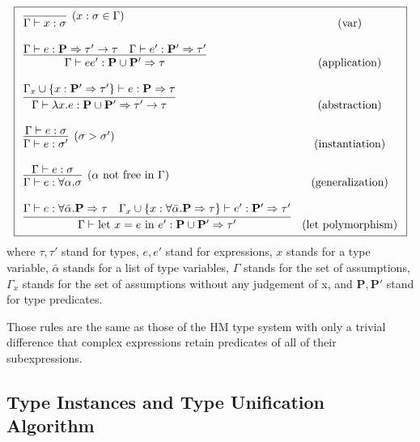 \begin{defn}
    $$\boxed{\begin{array}{l c}
        \infer[(x : \sigma \in \Gamma)]{\Gamma \vdash x : \sigma}{} & (\text{var}) \\\\
        \infer{\Gamma \vdash e e' : \mathbf{P} \cup \mathbf{P'}  \Rightarrow \tau}{\Gamma \vdash e : \mathbf{P} \Rightarrow \tau' \rightarrow \tau & \Gamma \vdash e' : \mathbf{P'} \Rightarrow \tau'} & (\text{application}) \\\\
        \infer{\Gamma \vdash \lambda x . e : \mathbf{P} \cup \mathbf{P'} \Rightarrow \tau' \rightarrow \tau}{\Gamma_x \cup \{x : \mathbf{P'} \Rightarrow \tau'\} \vdash e : \mathbf{P} \Rightarrow \tau} & (\text{abstraction}) \\\\
        \infer[(\sigma > \sigma')]{\Gamma \vdash e : \sigma'}{\Gamma \vdash e : \sigma} & (\text{instantiation}) \\\\
        \infer[(\alpha \text{ not free in }\Gamma)]{\Gamma \vdash e : \forall \alpha . \sigma}{\Gamma \vdash e : \sigma} & (\text{generalization}) \\\\
        \infer{\Gamma \vdash \text{let } x = e \text{ in } e' : \mathbf{P} \cup \mathbf{P'} \Rightarrow \tau'}{\Gamma \vdash e : \forall \bar{\alpha} .  \mathbf{P} \Rightarrow \tau & \Gamma_x \cup \{x :\forall \bar{\alpha} .  \mathbf{P} \Rightarrow \tau \} \vdash e' : \mathbf{P'} \Rightarrow \tau'} & (\text{let polymorphism})
    \end{array}}$$
    where $\tau, \tau'$ stand for types, $e, e'$ stand for expressions, $x$ stands for a type variable, $\bar{\alpha}$ stands for a list of type variables, $\Gamma$ stands for the set of assumptions, $\Gamma_x$ stands for the set of assumptions without any judgement of x, and $\mathbf{P}, \mathbf{P'}$ stand for type predicates.
\end{defn}

Those rules are the same as those of the HM type system with only a trivial difference that complex expressions retain predicates of all of their subexpressions.


\subsection{Type Instances and Type Unification Algorithm}

